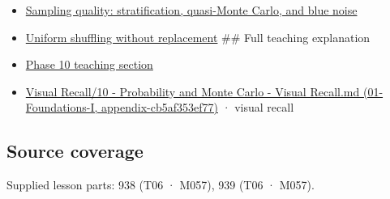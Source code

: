 \begin{itemize}
\item
  \hyperref[appendix-9f693ffd82bc]{Sampling quality: stratification, quasi-Monte Carlo, and blue noise}
\item
  \hyperref[appendix-184fcc411663]{Uniform shuffling without replacement} \#\# Full teaching explanation
\item
  \href{Continuous\%20Notes/Computing\%20Foundations\%20-\%20From\%20Bits\%20to\%20C++\%20and\%20Systems\%20APIs\#6.\%20A\%20computer\%20produces\%20deterministic\%20pseudorandom\%20sequences}{Phase 10 teaching section}
\item
  \href{}{Visual Recall/10 - Probability and Monte Carlo - Visual Recall.md (01-Foundations-I, appendix-cb5af353ef77)} · visual recall
\end{itemize}

\subsection{Source coverage}\label{source-coverage}

Supplied lesson parts: 938 (T06 · M057), 939 (T06 · M057).
